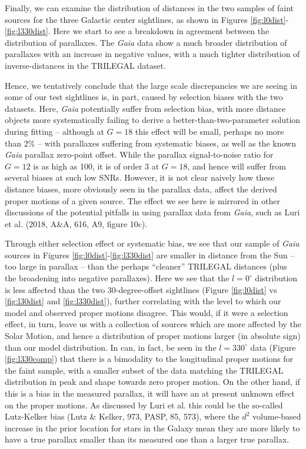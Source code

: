 \documentclass[fleqn,usenatbib]{mnras}
\begin{document}
Finally, we can examine the distribution of distances in the two samples of faint sources for the three Galactic center sightlines, as shown in Figures \ref{fig:l0dist}-\ref{fig:l330dist}. Here we start to see a breakdown in agreement between the distribution of parallaxes. The \textit{Gaia} data show a much broader distribution of parallaxes with an increase in negative values, with a much tighter distribution of inverse-distances in the TRILEGAL dataset.

Hence, we tentatively conclude that the large scale discrepancies we are seeing in some of our test sightlines is, in part, caused by selection biases with the two datasets. Here, \textit{Gaia} potentially suffer from selection bias, with more distance objects more systematically failing to derive a better-than-two-parameter solution during fitting -- although at $G = 18$ this effect will be small, perhaps no more than 2\% -- with parallaxes suffering from systematic biases, as well as the known \textit{Gaia} parallax zero-point offset. While the parallax signal-to-noise ratio for $G=12$ is as high as 100, it is of order 3 at $G=18$, and hence will suffer from several biases at such low SNRs. However, it is not clear naively how these distance biases, more obviously seen in the parallax data, affect the derived proper motions of a given source. The effect we see here is mirrored in other discussions of the potential pitfalls in using parallax data from \textit{Gaia}, such as Luri et al. (2018, A\&A, 616, A9, figure 10c).

Through either selection effect or systematic bias, we see that our sample of \textit{Gaia} sources in Figures \ref{fig:l0dist}-\ref{fig:l330dist} are smaller in distance from the Sun -- too large in parallax -- than the perhaps ``cleaner'' TRILEGAL distances (plus the broadening into negative parallaxes). Here we see that the $l = 0^\circ$ distribution is less affected than the two 30-degree-offset sightlines (Figure \ref{fig:l0dist} vs \ref{fig:l30dist} and \ref{fig:l330dist}), further correlating with the level to which our model and observed proper motions disagree. This would, if it were a selection effect, in turn, leave us with a collection of sources which are more affected by the Solar Motion, and hence a distribution of proper motions larger (in absolute sign) than our model distribution. In can, in fact, be seen in the $l = 330^\circ$ data (Figure \ref{fig:l330comp}) that there is a bimodality to the longitudinal proper motions for the faint sample, with a smaller subset of the data matching the TRILEGAL distribution in peak and shape towards zero proper motion. On the other hand, if this is a bias in the measured parallax, it will have an at present unknown effect on the proper motions. As discussed by Luri et al. this could be the so-called Lutz-Kelker bias (Lutz \& Kelker, 973, PASP, 85, 573), where the $d^2$ volume-based increase in the prior location for stars in the Galaxy mean they are more likely to have a true parallax smaller than its measured one than a larger true parallax.
\end{document}
